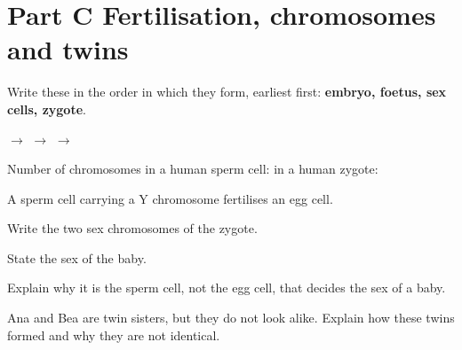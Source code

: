 \documentclass[11pt]{article}
\begin{document}
\section{Part C \textperiodcentered{} Fertilisation, chromosomes and twins}
\Q Write these in the order in which they form, earliest first: \textbf{embryo, foetus, sex cells, zygote}.
\par {} $\rightarrow$  $\rightarrow$  $\rightarrow$ 
\par\vspace{2.5mm} Number of chromosomes in a human sperm cell:  \quad in a human zygote: \par\vspace{2mm}

\Q A sperm cell carrying a Y chromosome fertilises an egg cell.
\par{} Write the two sex chromosomes of the zygote. \hfill{}
\par\vspace{1mm} State the sex of the baby. \hfill{}
\par\vspace{1mm} Explain why it is the sperm cell, not the egg cell, that decides the sex of a baby.

\Q Ana and Bea are twin sisters, but they do not look alike. Explain how these twins formed and why they are not identical.
\end{document}
